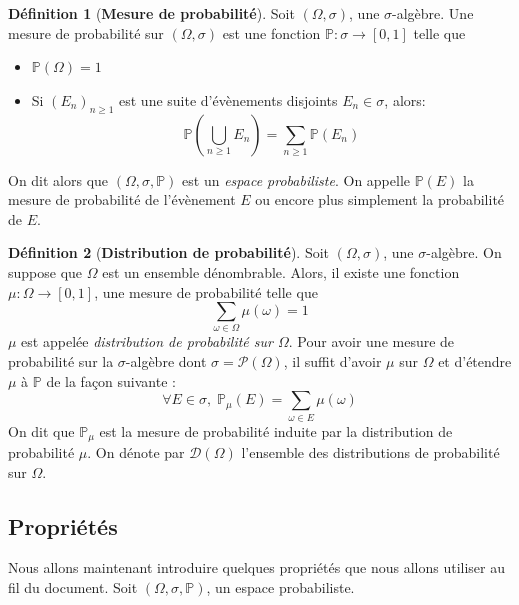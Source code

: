 \documentclass[12pt,a4paper]{report}
\theoremstyle{definition}%
\newtheorem{definition}{Définition}[chapter]
\theoremstyle{remark}
\newcommand{\pr}{\mathbb{P}}
\let\labelitemi\labelitemii
\begin{document}
\begin{definition}[\textbf{Mesure de probabilité}]\label{proba_measure} Soit $(\Omega, \sigma)$, une $\sigma$-algèbre.
	Une mesure de probabilité sur $(\Omega, \sigma)$ est une fonction $\mathbb{P} : \sigma \rightarrow [0, 1]$ telle que
	\begin{itemize}
		\renewcommand{\labelitemi}{\tiny$\bullet$}
		\item $\mathbb{P}(\Omega) = 1$
		\item Si $(E_n)_{n \geq 1}$ est une suite d'évènements disjoints $E_n \in \sigma$, alors:
		\[\mathbb{P}(\bigcup_{n \geq 1} E_n) = \sum_{n \geq 1} \mathbb{P}(E_n)\]
	\end{itemize}
	On dit alors que $(\Omega, \sigma, \mathbb{P})$ est un \textit{espace probabiliste}.
	On appelle $\mathbb{P}(E)$ la mesure de probabilité de l'évènement $E$ ou encore plus simplement la probabilité de $E$.
\end{definition}

\begin{definition}[\textbf{Distribution de probabilité}] \label{distriprobadef}
	Soit $(\Omega, \sigma)$, une $\sigma$-algèbre.
	On suppose que $\Omega$ est un ensemble dénombrable. Alors, il existe une fonction $\mu: \Omega \rightarrow [0,1]$, une mesure de probabilité telle que
	\[\sum_{\omega \in \Omega} \mu(\omega) =1 \]
	$\mu$ est appelée \textit{distribution de probabilité sur $\Omega$}. Pour avoir une mesure de probabilité sur la $\sigma$-algèbre dont $\sigma = \mathcal{P}(\Omega)$, il suffit d'avoir $\mu$ sur $\Omega$ et d'étendre $\mu$ à $\pr$ de la façon suivante :
	\[ \forall E \in \sigma,\; \mathbb{P}_{\mu}(E) = \sum_{\omega \in E} \mu(\omega)\] On dit que $\pr_{\mu}$ est la mesure de probabilité induite par la distribution de probabilité $\mu$.
	On dénote par $\mathcal{D}(\Omega)$ l'ensemble des distributions de probabilité sur $\Omega$.
\end{definition}

\subsection*{Propriétés}
	Nous allons maintenant introduire quelques propriétés que nous allons utiliser au fil du document.
	Soit $(\Omega, \sigma, \mathbb{P})$, un espace probabiliste.
\end{document}
